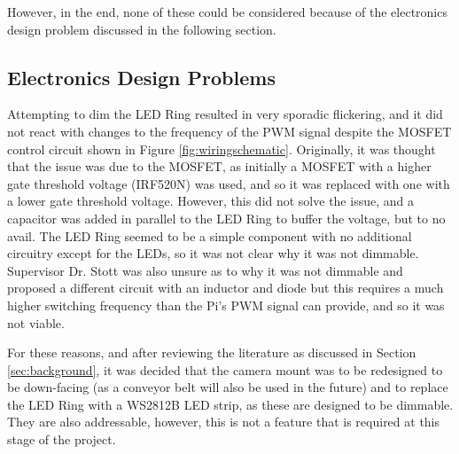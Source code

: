 \vspace{-0.5em}
\noindent
However, in the end, none of these could be considered because of the electronics design problem discussed in the following section. \\
\noindent
\subsection{Electronics Design Problems}
Attempting to dim the LED Ring resulted in very sporadic flickering, and it did not react with changes to the frequency of the PWM signal despite the MOSFET control circuit shown in Figure \ref{fig:wiringschematic}.
Originally, it was thought that the issue was due to the MOSFET, as initially a MOSFET with a higher gate threshold voltage (IRF520N) was used, and so it was replaced with one with a lower gate threshold voltage.
However, this did not solve the issue, and a capacitor was added in parallel to the LED Ring to buffer the voltage, but to no avail.
The LED Ring seemed to be a simple component with no additional circuitry except for the LEDs, so it was not clear why it was not dimmable. Supervisor Dr. Stott was also unsure as to why it was not dimmable and proposed a different circuit with an inductor and diode but this requires
a much higher switching frequency than the Pi's PWM signal can provide, and so it was not viable. 

For these reasons, and after reviewing the literature as discussed in Section \ref{sec:background}, it was decided that the camera mount was to be redesigned to be down-facing (as a conveyor belt will also be used in the future)
and to replace the LED Ring with a WS2812B LED strip, as these are designed to be dimmable. They are also addressable, however, this is not a feature that is required at this stage of the project.
